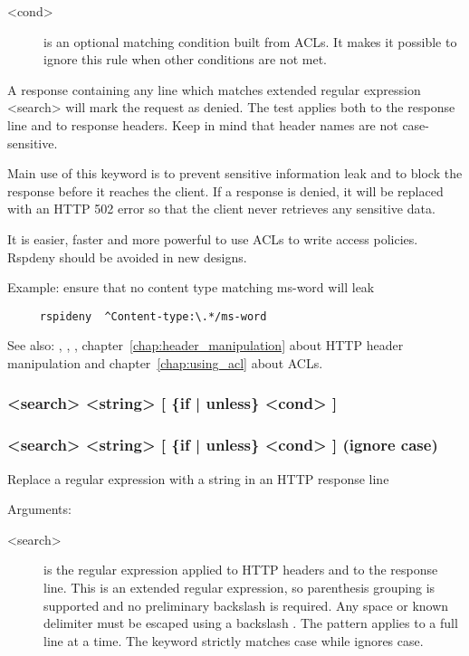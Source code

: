 {\begin{description}
  \item[<cond>] is an optional matching condition built from ACLs. It makes it
              possible to ignore this rule when other conditions are not met.
  \end{description}

  A response containing any line which matches extended regular expression
  <search> will mark the request as denied. The test applies both to the
  response line and to response headers. Keep in mind that header names are not
  case-sensitive.

  Main use of this keyword is to prevent sensitive information leak and to
  block the response before it reaches the client. If a response is denied, it
  will be replaced with an HTTP 502 error so that the client never retrieves
  any sensitive data.

  It is easier, faster and more powerful to use ACLs to write access policies.
  Rspdeny should be avoided in new designs.

  Example: ensure that no content type matching ms-word will leak
  \begin{verbatim}
     rspideny  ^Content-type:\.*/ms-word
  \end{verbatim}

  See also: , , , chapter~\ref{chap:header_manipulation} about HTTP header manipulation
            and chapter~\ref{chap:using_acl} about ACLs.

\subsubsection[rsprep]{ <search> <string> [ \{if | unless\} <cond> ]}
\subsubsection[rspirep]{ <search> <string> [ \{if | unless\} <cond> ]  (ignore case)}

  Replace a regular expression with a string in an HTTP response line


  Arguments:
  \begin{description}
  \item[<search>] is the regular expression applied to HTTP headers and to the
              response line. This is an extended regular expression, so
              parenthesis grouping is supported and no preliminary backslash
              is required. Any space or known delimiter must be escaped using
              a backslash \chr{\bslash}. The pattern applies to a full line at a time.
              The  keyword strictly matches case while 
              ignores case.


\end{description}}
